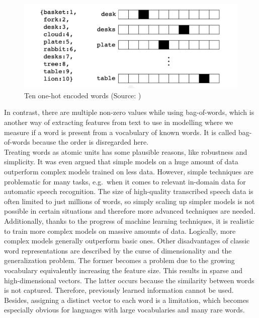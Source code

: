 \documentclass[
]{krantz}
\begin{document}
\begin{figure}

{\centering \includegraphics[width=0.7\linewidth]{./figures/01-01-nlp/onehot_pilehvar_p10} 

}

\caption{Ten one-hot encoded words (Source: \citet{Pilehvar2021})}\label{fig:onehot}
\end{figure}



In contrast, there are multiple non-zero values while using
bag-of-words, which is another way of extracting features from text to
use in modelling where we measure if a word is present from a vocabulary
of known words. It is called bag-of-words because the order is
disregarded here.\\

Treating words as atomic units has some plausible reasons, like
robustness and simplicity. It was even argued that simple models on a
huge amount of data outperform complex models trained on less data.
However, simple techniques are problematic for many tasks, e.g.~when it
comes to relevant in-domain data for automatic speech recognition. The
size of high-quality transcribed speech data is often limited to just
millions of words, so simply scaling up simpler models is not possible
in certain situations and therefore more advanced techniques are needed.
Additionally, thanks to the progress of machine learning techniques, it
is realistic to train more complex models on massive amounts of data.
Logically, more complex models generally outperform basic ones. Other
disadvantages of classic word representations are described by the curse
of dimensionality and the generalization problem. The former becomes a
problem due to the growing vocabulary equivalently increasing the
feature size. This results in sparse and high-dimensional vectors. The
latter occurs because the similarity between words is not captured.
Therefore, previously learned information cannot be used. Besides,
assigning a distinct vector to each word is a limitation, which becomes
especially obvious for languages with large vocabularies and many rare
words.\\
\end{document}
